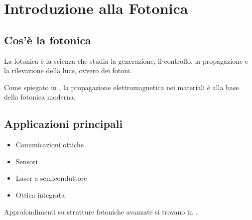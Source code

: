 \chapter{Introduzione alla Fotonica}

\section{Cos'è la fotonica}
La fotonica è la scienza che studia la generazione, il controllo, la propagazione e la rilevazione della luce, ovvero dei fotoni.

Come spiegato in \cite{saleh1991fotonica}, la propagazione elettromagnetica nei materiali è alla base della fotonica moderna.

\section{Applicazioni principali}
\begin{itemize}
    \item Comunicazioni ottiche
    \item Sensori
    \item Laser a semiconduttore
    \item Ottica integrata
\end{itemize}

Approfondimenti su strutture fotoniche avanzate si trovano in \cite{joannopoulos2008molding}.
